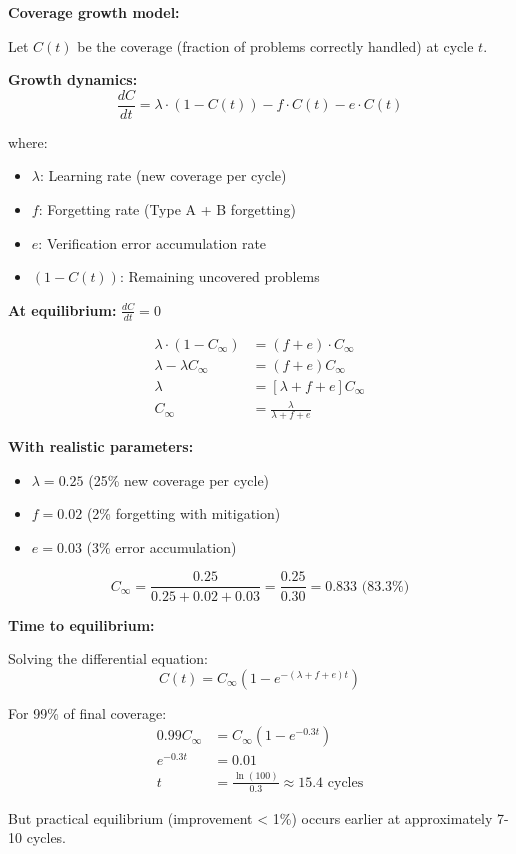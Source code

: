 \documentclass[12pt,a4paper]{article}
\theoremstyle{definition}
\begin{document}
\begin{proofbox}
\textbf{Coverage growth model:}

Let $C(t)$ be the coverage (fraction of problems correctly handled) at cycle $t$.

\textbf{Growth dynamics:}
\begin{equation}
\frac{dC}{dt} = \lambda \cdot (1 - C(t)) - f \cdot C(t) - e \cdot C(t)
\end{equation}

where:
\begin{itemize}
    \item $\lambda$: Learning rate (new coverage per cycle)
    \item $f$: Forgetting rate (Type A + B forgetting)
    \item $e$: Verification error accumulation rate
    \item $(1-C(t))$: Remaining uncovered problems
\end{itemize}

\textbf{At equilibrium:} $\frac{dC}{dt} = 0$

\begin{align}
\lambda \cdot (1 - C_{\infty}) &= (f + e) \cdot C_{\infty} \\
\lambda - \lambda C_{\infty} &= (f + e) C_{\infty} \\
\lambda &= [\lambda + f + e] C_{\infty} \\
C_{\infty} &= \frac{\lambda}{\lambda + f + e}
\end{align}

\textbf{With realistic parameters:}
\begin{itemize}
    \item $\lambda = 0.25$ (25\% new coverage per cycle)
    \item $f = 0.02$ (2\% forgetting with mitigation)
    \item $e = 0.03$ (3\% error accumulation)
\end{itemize}

\begin{equation}
C_{\infty} = \frac{0.25}{0.25 + 0.02 + 0.03} = \frac{0.25}{0.30} = 0.833 \text{ (83.3\%)}
\end{equation}

\textbf{Time to equilibrium:}

Solving the differential equation:
\begin{equation}
C(t) = C_{\infty}(1 - e^{-(\lambda + f + e)t})
\end{equation}

For 99\% of final coverage:
\begin{align}
0.99 C_{\infty} &= C_{\infty}(1 - e^{-0.3t}) \\
e^{-0.3t} &= 0.01 \\
t &= \frac{\ln(100)}{0.3} \approx 15.4 \text{ cycles}
\end{align}

But practical equilibrium (improvement < 1\%) occurs earlier at approximately 7-10 cycles.
\end{proofbox}
\end{document}
